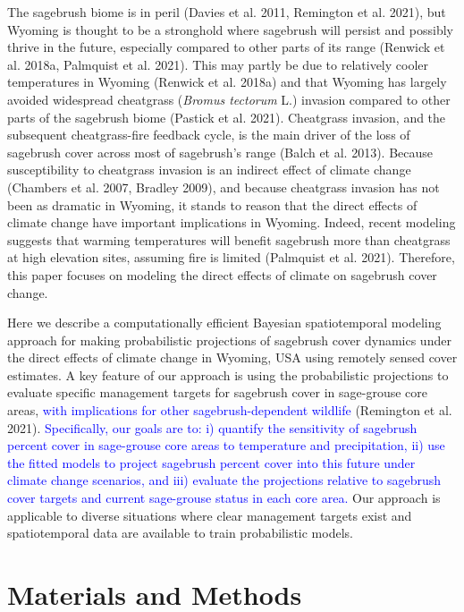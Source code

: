 \documentclass[
  12pt,
]{article}
\begin{document}
The sagebrush biome is in peril (Davies et al. 2011, Remington et al. 2021),
but Wyoming is thought to be a stronghold where sagebrush will persist and possibly thrive in the future, especially compared to other parts of its range (Renwick et al. 2018a, Palmquist et al. 2021).
This may partly be due to relatively cooler temperatures in Wyoming (Renwick et al. 2018a) and that Wyoming has largely avoided widespread cheatgrass (\emph{Bromus tectorum} L.) invasion compared to other parts of the sagebrush biome (Pastick et al. 2021).
Cheatgrass invasion, and the subsequent cheatgrass-fire feedback cycle, is the main driver of the loss of sagebrush cover across most of sagebrush's range (Balch et al. 2013).
Because susceptibility to cheatgrass invasion is an indirect effect of climate change (Chambers et al. 2007, Bradley 2009), and because cheatgrass invasion has not been as dramatic in Wyoming, it stands to reason that the direct effects of climate change have important implications in Wyoming.
Indeed, recent modeling suggests that warming temperatures will benefit sagebrush more than cheatgrass at high elevation sites, assuming fire is limited (Palmquist et al. 2021).
Therefore, this paper focuses on modeling the direct effects of climate on sagebrush cover change.

Here we describe a computationally efficient Bayesian spatiotemporal modeling approach for making probabilistic projections of sagebrush cover dynamics under the direct effects of climate change in Wyoming, USA using remotely sensed cover estimates.
A key feature of our approach is using the probabilistic projections to evaluate specific management targets for sagebrush cover in sage-grouse core areas, \textcolor{blue}{with implications for other sagebrush-dependent wildlife} (Remington et al. 2021).
\textcolor{blue}{Specifically, our goals are to: i) quantify the sensitivity of sagebrush percent cover in sage-grouse core areas to temperature and precipitation, ii) use the fitted models to project sagebrush percent cover into this future under climate change scenarios, and iii) evaluate the projections relative to sagebrush cover targets and current sage-grouse status in each core area.}
Our approach is applicable to diverse situations where clear management targets exist and spatiotemporal data are available to train probabilistic models.

\hypertarget{materials-and-methods}{%
\section{Materials and Methods}\label{materials-and-methods}}
\end{document}

